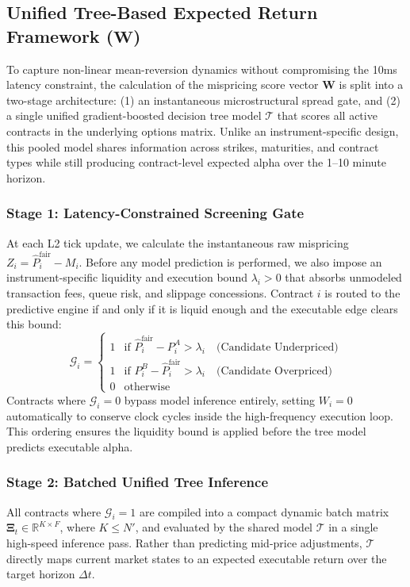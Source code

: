 \documentclass[11pt, a4paper]{article}
\begin{document}
\subsection{Unified Tree-Based Expected Return Framework ($\mathbf{W}$)}

To capture non-linear mean-reversion dynamics without compromising the 10ms latency constraint, the calculation of the mispricing score vector $\mathbf{W}$ is split into a two-stage architecture: (1) an instantaneous microstructural spread gate, and (2) a single unified gradient-boosted decision tree model $\mathcal{T}$ that scores all active contracts in the underlying options matrix. Unlike an instrument-specific design, this pooled model shares information across strikes, maturities, and contract types while still producing contract-level expected alpha over the 1--10 minute horizon.

\subsubsection{Stage 1: Latency-Constrained Screening Gate}
At each L2 tick update, we calculate the instantaneous raw mispricing $Z_i = \widehat{P}^{\mathrm{fair}}_i - M_i$. Before any model prediction is performed, we also impose an instrument-specific liquidity and execution bound $\lambda_i > 0$ that absorbs unmodeled transaction fees, queue risk, and slippage concessions. Contract $i$ is routed to the predictive engine if and only if it is liquid enough and the executable edge clears this bound:
\begin{equation}
\mathcal{G}_i = \begin{cases} 
1 & \text{if } \widehat{P}^{\mathrm{fair}}_i - P^{A}_i > \lambda_i \quad \text{(Candidate Underpriced)} \\
1 & \text{if } P^{B}_i - \widehat{P}^{\mathrm{fair}}_i > \lambda_i \quad \text{(Candidate Overpriced)} \\
0 & \text{otherwise}
\end{cases}
\end{equation}
Contracts where $\mathcal{G}_i = 0$ bypass model inference entirely, setting $W_i = 0$ automatically to conserve clock cycles inside the high-frequency execution loop. This ordering ensures the liquidity bound is applied before the tree model predicts executable alpha.

\subsubsection{Stage 2: Batched Unified Tree Inference}
All contracts where $\mathcal{G}_i = 1$ are compiled into a compact dynamic batch matrix $\mathbf{\Xi}_t \in \mathbb{R}^{K \times F}$, where $K \le N'$, and evaluated by the shared model $\mathcal{T}$ in a single high-speed inference pass. Rather than predicting mid-price adjustments, $\mathcal{T}$ directly maps current market states to an expected executable return over the target horizon $\Delta t$.
\end{document}
